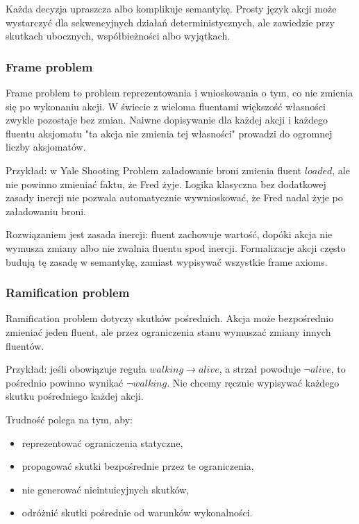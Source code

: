 Każda decyzja upraszcza albo komplikuje semantykę. Prosty język akcji może wystarczyć dla sekwencyjnych działań deterministycznych, ale zawiedzie przy skutkach ubocznych, współbieżności albo wyjątkach.

\subsubsection{Frame problem}

Frame problem to problem reprezentowania i wnioskowania o tym, co nie zmienia się po wykonaniu akcji. W świecie z wieloma fluentami większość własności zwykle pozostaje bez zmian. Naiwne dopisywanie dla każdej akcji i każdego fluentu aksjomatu "ta akcja nie zmienia tej własności" prowadzi do ogromnej liczby aksjomatów.

Przykład: w Yale Shooting Problem załadowanie broni zmienia fluent $loaded$, ale nie powinno zmieniać faktu, że Fred żyje. Logika klasyczna bez dodatkowej zasady inercji nie pozwala automatycznie wywnioskować, że Fred nadal żyje po załadowaniu broni.

Rozwiązaniem jest zasada inercji: fluent zachowuje wartość, dopóki akcja nie wymusza zmiany albo nie zwalnia fluentu spod inercji. Formalizacje akcji często budują tę zasadę w semantykę, zamiast wypisywać wszystkie frame axioms.

\subsubsection{Ramification problem}

Ramification problem dotyczy skutków pośrednich. Akcja może bezpośrednio zmieniać jeden fluent, ale przez ograniczenia stanu wymuszać zmiany innych fluentów.

Przykład: jeśli obowiązuje reguła $walking\to alive$, a strzał powoduje $\neg alive$, to pośrednio powinno wynikać $\neg walking$. Nie chcemy ręcznie wypisywać każdego skutku pośredniego każdej akcji.

Trudność polega na tym, aby:
\begin{itemize}
  \item reprezentować ograniczenia statyczne,
  \item propagować skutki bezpośrednie przez te ograniczenia,
  \item nie generować nieintuicyjnych skutków,
  \item odróżnić skutki pośrednie od warunków wykonalności.
\end{itemize}

